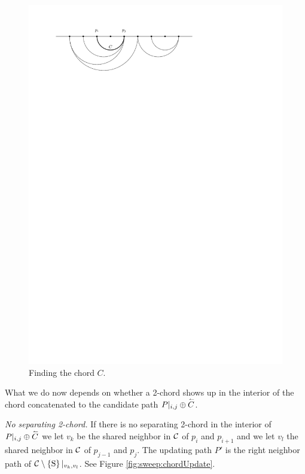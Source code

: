     \begin{figure}[b]
      \centering
      \includegraphics[scale=1]{unifiedalgo/img/sweep/chordsOnCandidatePath}
      \caption{Finding the chord $C$.}
      \label{fig:sweep:chordsOnCandidatePath}
    \end{figure}

    What we do now depends on whether a 2-chord shows up in the interior of the chord concatenated to the candidate path $P|_{i, j} \oplus \accentset{\leftharpoonup}{{C}}$.

    \emph{No separating 2-chord.}
      If there is no separating 2-chord in the interior of $P|_{i, j} \oplus \accentset{\leftharpoonup}{{C}}$ we let $v_k$ be the shared neighbor in $\mathcal{C}$ of $p_{i}$ and $p_{i +1}$ and we let $v_l$ the shared neighbor in $\mathcal{C}$ of $p_{j -1}$ and $p_{j}$. The updating path $P'$ is the right neighbor path of $\mathcal{C} \setminus \left\lbrace {\mathrm{S}} \right\rbrace|_{v_k, v_l}$. See Figure \ref{fig:sweep:chordUpdate}.

